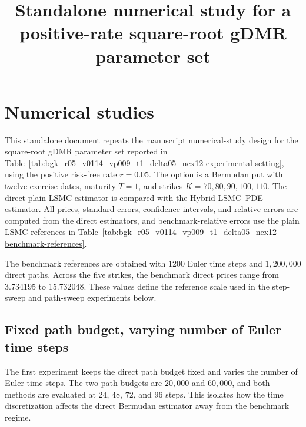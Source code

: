 \documentclass[pdflatex,sn-mathphys-num]{sn-jnl}
\begin{document}
\title[Standalone numerical study for a positive-rate square-root gDMR parameter set]{Standalone numerical study for a positive-rate square-root gDMR parameter set}

\author[1]{ }
\author[1]{ }

\maketitle

\section{Numerical studies}

This standalone document repeats the manuscript numerical-study design for the square-root gDMR parameter set reported in Table~\ref{tab:bgk_r05_v0114_vp009_t1_delta05_nex12-experimental-setting}, using the positive risk-free rate \(r=0.05\). The option is a Bermudan put with twelve exercise dates, maturity \(T=1\), and strikes \(K=70,80,90,100,110\). The direct plain LSMC estimator is compared with the Hybrid LSMC--PDE estimator. All prices, standard errors, confidence intervals, and relative errors are computed from the direct estimators, and benchmark-relative errors use the plain LSMC references in Table~\ref{tab:bgk_r05_v0114_vp009_t1_delta05_nex12-benchmark-references}.



The benchmark references are obtained with \(1200\) Euler time steps and \(1,200,000\) direct paths. Across the five strikes, the benchmark direct prices range from 3.734195 to 15.732048. These values define the reference scale used in the step-sweep and path-sweep experiments below.



\subsection{Fixed path budget, varying number of Euler time steps}

The first experiment keeps the direct path budget fixed and varies the number of Euler time steps. The two path budgets are \(20,000\) and \(60,000\), and both methods are evaluated at \(24\), \(48\), \(72\), and \(96\) steps. This isolates how the time discretization affects the direct Bermudan estimator away from the benchmark regime.
\end{document}
